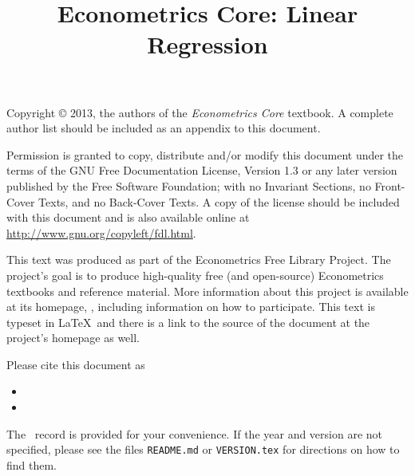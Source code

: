 \documentclass{tex/tufte-handout}
\title{Econometrics Core: Linear Regression}
\begin{document}
\maketitle

\bigskip\noindent%
Copyright © 2013, the authors of the \textit{Econometrics Core}
textbook.  A complete author list should be included as an appendix to
this document.

Permission is granted to copy, distribute and/or modify this document
under the terms of the GNU Free Documentation License, Version 1.3 or
any later version published by the Free Software Foundation; with no
Invariant Sections, no Front-Cover Texts, and no Back-Cover Texts.  A
copy of the license should be included with this document and is also
available online at \url{http://www.gnu.org/copyleft/fdl.html}.

This text was produced as part of the Econometrics Free Library
Project.  The project's goal is to produce high-quality free (and
open-source) Econometrics textbooks and reference material.  More
information about this project is available at its homepage,
\homepage, including information on how
to participate.  This text is typeset in \LaTeX\ and there is a link
to the source of the document at the project's homepage as well.

Please cite this document as
\begin{itemize}
\item[] 
\item[] 
\end{itemize}
The \BibTeX\ record is provided for your convenience.
If the year and version are not specified, please see the files
\texttt{README.md} or \texttt{VERSION.tex} for directions on how to
find them.

\tableofcontents









\end{document}
